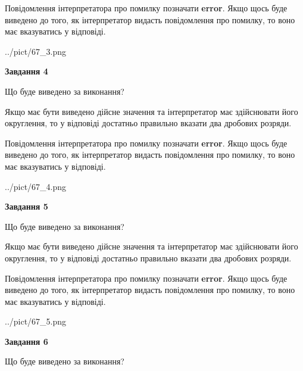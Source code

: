 \documentclass[12pt, ukrainian]{article}
\begin{document}
{\begin {Large}
Повідомлення інтерпретатора про помилку позначати \textbf{error}.
Якщо щось буде виведено до того, як інтерпретатор видасть повідомлення про помилку, 
то воно має вказуватись у відповіді. \par

\begin{center}
	{../pict/67_3.png}
\end{center}
\newpage

{\begin {center}\textbf{Завдання 4}\end {center}}\par
Що буде виведено за виконання? \par

Якщо має бути виведено дійсне значення та інтерпретатор має здійснювати його округлення, 
то у відповіді достатньо правильно вказати два дробових розряди.

Повідомлення інтерпретатора про помилку позначати \textbf{error}.
Якщо щось буде виведено до того, як інтерпретатор видасть повідомлення про помилку, 
то воно має вказуватись у відповіді. \par

\begin{center}
	{../pict/67_4.png}
\end{center}
\newpage

{\begin {center}\textbf{Завдання 5}\end {center}}\par
Що буде виведено за виконання? \par

Якщо має бути виведено дійсне значення та інтерпретатор має здійснювати його округлення, 
то у відповіді достатньо правильно вказати два дробових розряди.

Повідомлення інтерпретатора про помилку позначати \textbf{error}.
Якщо щось буде виведено до того, як інтерпретатор видасть повідомлення про помилку, 
то воно має вказуватись у відповіді. \par

\begin{center}
	{../pict/67_5.png}
\end{center}
\newpage

{\begin {center}\textbf{Завдання 6}\end {center}}\par
Що буде виведено за виконання? \par


\end{Large}}
\end{document}
